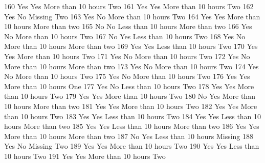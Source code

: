 \documentclass[
  letterpaper,
  DIV=11,
  numbers=noendperiod]{scrreprt}
\newenvironment{Shaded}{\begin{snugshade}}{\end{snugshade}}
\newcommand{\NormalTok}[1]{\textcolor[rgb]{0.00,0.23,0.31}{#1}}
\begin{document}
\begin{Shaded}
\begin{Highlighting}[]
\NormalTok{160               Yes            Yes More than 10 hours           Two}
\NormalTok{161               Yes            Yes More than 10 hours           Two}
\NormalTok{162               Yes             No            Missing           Two}
\NormalTok{163               Yes             No More than 10 hours           Two}
\NormalTok{164               Yes            Yes More than 10 hours More than two}
\NormalTok{165                No             No Less than 10 hours More than two}
\NormalTok{166               Yes             No More than 10 hours           Two}
\NormalTok{167                No            Yes Less than 10 hours           Two}
\NormalTok{168               Yes             No More than 10 hours More than two}
\NormalTok{169               Yes            Yes Less than 10 hours           Two}
\NormalTok{170               Yes            Yes More than 10 hours           Two}
\NormalTok{171               Yes             No More than 10 hours           Two}
\NormalTok{172               Yes             No More than 10 hours More than two}
\NormalTok{173               Yes             No More than 10 hours           Two}
\NormalTok{174               Yes             No More than 10 hours           Two}
\NormalTok{175               Yes             No More than 10 hours           Two}
\NormalTok{176               Yes            Yes More than 10 hours           One}
\NormalTok{177               Yes             No Less than 10 hours           Two}
\NormalTok{178               Yes            Yes More than 10 hours           Two}
\NormalTok{179               Yes            Yes More than 10 hours           Two}
\NormalTok{180                No            Yes More than 10 hours More than two}
\NormalTok{181               Yes            Yes More than 10 hours           Two}
\NormalTok{182               Yes            Yes More than 10 hours           Two}
\NormalTok{183               Yes            Yes Less than 10 hours           Two}
\NormalTok{184               Yes            Yes Less than 10 hours More than two}
\NormalTok{185               Yes            Yes Less than 10 hours More than two}
\NormalTok{186               Yes            Yes More than 10 hours More than two}
\NormalTok{187                No            Yes Less than 10 hours       Missing}
\NormalTok{188               Yes             No            Missing           Two}
\NormalTok{189               Yes            Yes More than 10 hours           Two}
\NormalTok{190               Yes            Yes Less than 10 hours           Two}
\NormalTok{191               Yes            Yes More than 10 hours           Two}

\end{Highlighting}
\end{Shaded}
\end{document}
